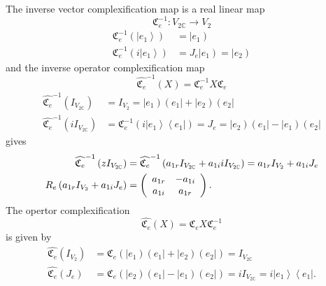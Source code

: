 \documentclass[aps,preprint]{revtex4}%
\begin{document}
The inverse vector complexification map is a real linear map
\begin{equation}
\mathfrak{C}_{e}^{-1}:V_{2\mathbb{C}}\rightarrow V_{2}%
\end{equation}%
\begin{align}
\mathfrak{C}_{e}^{-1}\left(  \left\vert e_{1}\right\rangle \right)   &
=\left\vert e_{1}\right) \\
\mathfrak{C}_{e}^{-1}\left(  i\left\vert e_{1}\right\rangle \right)   &
=J_{e}\left\vert e_{1}\right)  =\left\vert e_{2}\right)
\end{align}
and the inverse operator complexification map
\begin{equation}
\widehat{\mathfrak{C}_{e}}^{-1}\left(  X\right)  =\mathfrak{C}_{e}%
^{-1}X\mathfrak{C}_{e}%
\end{equation}
\begin{align}
\widehat{\mathfrak{C}_{e}}^{-1}\left(  I_{V_{2\mathbb{C}}}\right)   &
=I_{V_{2}}=\left\vert e_{1}\right)  \left(  e_{1}\right\vert +\left\vert
e_{2}\right)  \left(  e_{2}\right\vert \\
\widehat{\mathfrak{C}_{e}}^{-1}\left(  iI_{V_{2\mathbb{C}}}\right)   &
=\mathfrak{C}_{e}^{-1}\left(  i\left\vert e_{1}\right\rangle \left\langle
e_{1}\right\vert \right)  =J_{e}=\left\vert e_{2}\right)  \left(
e_{1}\right\vert -\left\vert e_{1}\right)  \left(  e_{2}\right\vert
\end{align}
gives%
\begin{align}
\widehat{\mathfrak{C}_{e}}^{-1}\left(  zI_{V_{2\mathbb{C}}}\right)   &
=\widehat{\mathfrak{C}_{e}}^{-1}\left(  a_{1r}I_{V_{2\mathbb{C}}}%
+a_{1i}iI_{V_{2\mathbb{C}}}\right)  =a_{1r}I_{V_{2}}+a_{1i}J_{e}\\
R_{e}\left(  a_{1r}I_{V_{2}}+a_{1i}J_{e}\right)   &  =\left(
\begin{array}
[c]{cc}%
a_{1r} & -a_{1i}\\
a_{1i} & a_{1r}%
\end{array}
\right)  .
\end{align}
The opertor complexification
\begin{equation}
\widehat{\mathfrak{C}_{e}}\left(  X\right)  =\mathfrak{C}_{e}X\mathfrak{C}%
_{e}^{-1}%
\end{equation}
is given by
\begin{align}
\widehat{\mathfrak{C}_{e}}\left(  I_{V_{2}}\right)   &  =\mathfrak{C}%
_{e}\left(  \left\vert e_{1}\right)  \left(  e_{1}\right\vert +\left\vert
e_{2}\right)  \left(  e_{2}\right\vert \right)  =I_{V_{2\mathbb{C}}}\\
\widehat{\mathfrak{C}_{e}}\left(  J_{e}\right)   &  =\mathfrak{C}_{e}\left(
\left\vert e_{2}\right)  \left(  e_{1}\right\vert -\left\vert e_{1}\right)
\left(  e_{2}\right\vert \right)  =iI_{V_{2\mathbb{C}}}=i\left\vert
e_{1}\right\rangle \left\langle e_{1}\right\vert .
\end{align}
\end{document}
